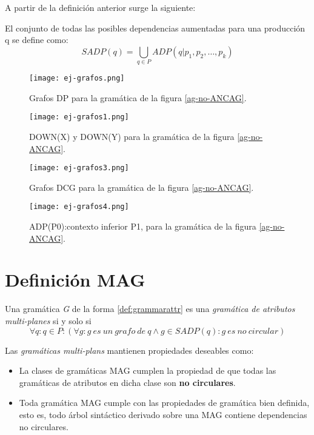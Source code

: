 A partir de la definición anterior surge la siguiente:
\begin{definition}
El conjunto de todas las posibles dependencias aumentadas para una producción q se define como:
\begin{equation}
SADP(q) = \bigcup\limits_{q\in P}{ADP (q | p_{1}, p_{2}, \dots, p_{k})} 
\end{equation}
\end{definition}

\begin{figure}\centering
 \texttt{[image: ej-grafos.png]}
\caption{\label{dp-wuu-yang}Grafos DP para la gramática de la figura \ref{ag-no-ANCAG}.}
\end{figure}
\begin{figure}\centering
 \texttt{[image: ej-grafos1.png]}
\caption{\label{down-wuu-yang} DOWN(X) y DOWN(Y) para la gramática de la figura \ref{ag-no-ANCAG}.}
\end{figure}

\begin{figure}\centering
 \texttt{[image: ej-grafos3.png]}
\caption{\label{dcg-wuu-yang} Grafos DCG para la gramática de la figura \ref{ag-no-ANCAG}.}
\end{figure}

\begin{figure}\centering
 \texttt{[image: ej-grafos4.png]}
\caption{\label{adp-wuu-yang} ADP(P0):contexto inferior P1, para la gramática de la figura \ref{ag-no-ANCAG}.}
\end{figure}

\section{Definición MAG}

Una gramática \textit{G} de la forma \ref{def:grammarattr} es una \textit{gramática de atributos multi-planes} si y solo si 
\begin{equation}
\forall q : q \in P: (\forall g:g\ es\ un\ grafo\ de\ q \wedge g \in SADP(q) : g\ es\ no\ circular) 
\end{equation}

Las \textit{gramáticas multi-plans} mantienen propiedades deseables como:
\begin{itemize}
\item La clases de gramáticas MAG cumplen la propiedad de que todas las gramáticas de atributos en dicha clase son \textbf{no circulares}.
\item Toda gramática MAG cumple con las propiedades de gramática bien definida, esto es, todo árbol sintáctico derivado sobre una MAG contiene dependencias no circulares.
\end{itemize}


